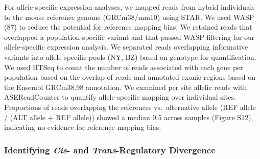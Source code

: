 \documentclass[9pt,twocolumn,twoside,lineno]{pnas-new}
\begin{document}
For allele-specific expression analyses, we mapped reads from hybrid
individuals to the mouse reference genome (GRCm38/mm10) using STAR. We
used WASP (87) to reduce the potential for reference mapping bias. We
retained reads that overlapped a population-specific variant and that
passed WASP filtering for our allele-specific expression analysis. We
separated reads overlapping informative variants into allele-specific
pools (NY, BZ) based on genotype for quantification. We used HTSeq to
count the number of reads associated with each gene per population based
on the overlap of reads and annotated exonic regions based on the
Ensembl GRCm38.98 annotation. We examined per site allelic reads with
ASEReadCounter to quantify allele-specific mapping over individual
sites. Proportions of reads overlapping the references vs.~alternative
allele (REF allele / (ALT allele + REF allele)) showed a median 0.5
across samples (Figure S12), indicating no evidence for reference
mapping bias.

\hypertarget{identifying-cis-and-trans-regulatory-divergene}{%
\subsubsection*{\texorpdfstring{Identifying \emph{Cis}- and
\emph{Trans}-Regulatory
Divergence}{Identifying Cis- and Trans-Regulatory Divergence}}\label{identifying-cis-and-trans-regulatory-divergene}}
\end{document}
